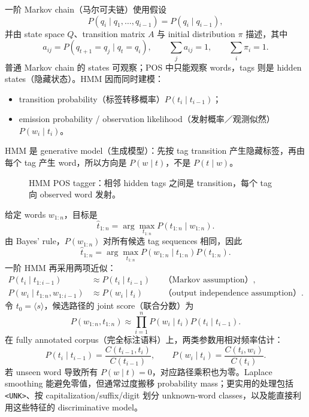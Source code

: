 
一阶 Markov chain（马尔可夫链）使用假设
\[
  P(q_i\mid q_1,\ldots,q_{i-1})=P(q_i\mid q_{i-1}),
\]
并由 state space $Q$、transition matrix $A$ 与 initial distribution $\pi$ 描述，其中
\[
  a_{ij}=P(q_{t+1}=q_j\mid q_t=q_i),
  \qquad \sum_j a_{ij}=1,
  \qquad \sum_i\pi_i=1.
\]
普通 Markov chain 的 states 可观察；POS 中只能观察 words，tags 则是 hidden states（隐藏状态）。HMM 因而同时建模：
\begin{itemize}
  \item transition probability（标签转移概率）$P(t_i\mid t_{i-1})$；
  \item emission probability / observation likelihood（发射概率／观测似然）$P(w_i\mid t_i)$。
\end{itemize}
HMM 是 generative model（生成模型）：先按 tag transition 产生隐藏标签，再由每个 tag 产生 word，所以方向是 $P(w\mid t)$，不是 $P(t\mid w)$。

\begin{figure}[htbp]
  \centering
  \resizebox{0.93\textwidth}{!}{}
  \caption{HMM POS tagger：相邻 hidden tags 之间是 transition，每个 tag 向 observed word 发射。}
  \label{fig:sc4002-l05-hmm}
\end{figure}


给定 words $w_{1:n}$，目标是
\[
  \hat t_{1:n}=\arg\max_{t_{1:n}}P(t_{1:n}\mid w_{1:n}).
\]
由 Bayes' rule，$P(w_{1:n})$ 对所有候选 tag sequences 相同，因此
\[
  \hat t_{1:n}
  =\arg\max_{t_{1:n}}P(w_{1:n}\mid t_{1:n})P(t_{1:n}).
\]
一阶 HMM 再采用两项近似：
\begin{align*}
  P(t_i\mid t_{1:i-1})&\approx P(t_i\mid t_{i-1})
  &&\text{（Markov assumption）},\\
  P(w_i\mid t_{1:n},w_{1:i-1})&\approx P(w_i\mid t_i)
  &&\text{（output independence assumption）}.
\end{align*}
令 $t_0=\langle s\rangle$，候选路径的 joint score（联合分数）为
\[
  P(w_{1:n},t_{1:n})
  \approx\prod_{i=1}^{n}P(w_i\mid t_i)P(t_i\mid t_{i-1}).
\]
在 fully annotated corpus（完全标注语料）上，两类参数用相对频率估计：
\[
  P(t_i\mid t_{i-1})
  =\frac{C(t_{i-1},t_i)}{C(t_{i-1})},
  \qquad
  P(w_i\mid t_i)
  =\frac{C(t_i,w_i)}{C(t_i)}.
\]
若 unseen word 导致所有 $P(w\mid t)=0$，对应路径乘积也为零。Laplace smoothing 能避免零值，但通常过度搬移 probability mass；更实用的处理包括 \texttt{<UNK>}、按 capitalization/suffix/digit 划分 unknown-word classes，以及能直接利用这些特征的 discriminative model。

